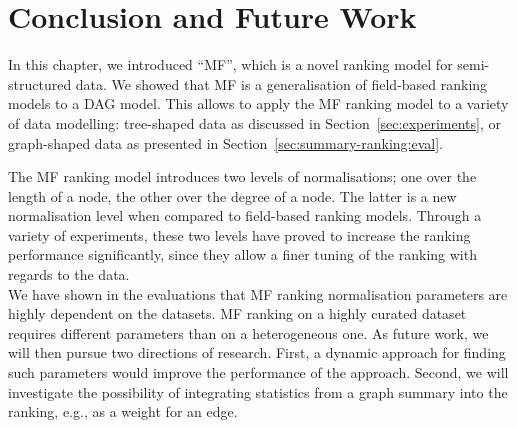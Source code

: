 \section{Conclusion and Future Work}

In this chapter, we introduced ``MF'', which is a novel ranking model for semi-structured data. We showed that \gls{MF} is a generalisation of field-based ranking models to a DAG model. This allows to apply the \gls{MF} ranking model to a variety of data modelling: tree-shaped data as discussed in Section~\ref{sec:experiments}, or graph-shaped data as presented in Section~\ref{sec:summary-ranking:eval}.

The \gls{MF} ranking model introduces two levels of normalisations; one over the length of a node, the other over the degree of a node. The latter is a new normalisation level when compared to field-based ranking models. Through a variety of experiments, these two levels have proved to increase the ranking performance significantly, since they allow a finer tuning of the ranking with regards to the data.\\

We have shown in the evaluations that \gls{MF} ranking normalisation parameters are highly dependent on the datasets. \gls{MF} ranking on a highly curated dataset requires different parameters than on a heterogeneous one. As future work, we will then pursue two directions of research. First, a dynamic approach for finding such parameters would improve the performance of the approach. Second, we will investigate the possibility of integrating statistics from a graph summary into the ranking, e.g., as a weight for an edge.
